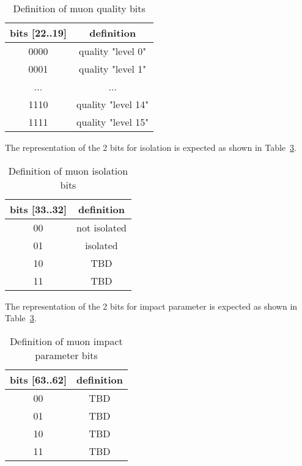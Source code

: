 \begin{table}[ht]
\caption{Definition of muon quality bits}
\vspace{5mm}
\centering
\begin{tabular}{|c|c|}\hline
bits [22..19] & definition \\\hline\hline
0000 & quality "level 0" \\
0001 & quality "level 1" \\
... & ... \\
1110 & quality "level 14" \\
1111 & quality "level 15" \\\hline
\end{tabular}
\label{tab:gtl:muon_quality_bits}
\end{table}

The representation of the 2 bits for isolation is expected as shown in Table~\ref{tab:gtl:muon_iso_bits}.\\

\begin{table}[ht]
\caption{Definition of muon isolation bits}
\vspace{5mm}
\centering
\begin{tabular}{|c|c|}\hline
bits [33..32] & definition \\\hline\hline
00 & not isolated \\
01 & isolated \\
10 & TBD \\
11 & TBD \\\hline
\end{tabular}
\label{tab:gtl:muon_iso_bits}
\end{table}

The representation of the 2 bits for impact parameter is expected as shown in Table~\ref{tab:gtl:muon_iso_bits}.\\

\begin{table}[ht]
\caption{Definition of muon impact parameter bits}
\vspace{5mm}
\centering
\begin{tabular}{|c|c|}\hline
bits [63..62] & definition \\\hline\hline
00 & TBD \\
01 & TBD \\
10 & TBD \\
11 & TBD \\\hline
\end{tabular}
\label{tab:gtl:muon_iso_bits}
\end{table}

